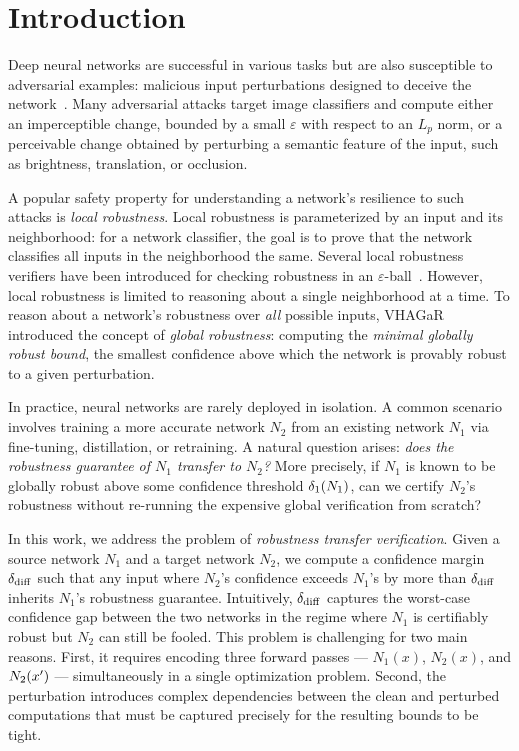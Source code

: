 \section{Introduction}
\label{sec:intro}

Deep neural networks are successful in various tasks but are also susceptible to adversarial examples: malicious input perturbations designed to deceive the network~\cite{szegedy2014,carlini2017,madry2018}. Many adversarial attacks target image classifiers and compute either an imperceptible change, bounded by a small $\varepsilon$ with respect to an $L_p$ norm, or a perceivable change obtained by perturbing a semantic feature of the input, such as brightness, translation, or occlusion.

A popular safety property for understanding a network's resilience to such attacks is \emph{local robustness}. Local robustness is parameterized by an input and its neighborhood: for a network classifier, the goal is to prove that the network classifies all inputs in the neighborhood the same. Several local robustness verifiers have been introduced for checking robustness in an $\varepsilon$-ball~\cite{singh2019,tjeng2019,wang2021}. However, local robustness is limited to reasoning about a single neighborhood at a time. To reason about a network's robustness over \emph{all} possible inputs, VHAGaR~\cite{vaghar} introduced the concept of \emph{global robustness}: computing the \emph{minimal globally robust bound}, the smallest confidence above which the network is provably robust to a given perturbation.

In practice, neural networks are rarely deployed in isolation. A common scenario involves training a more accurate network $N_2$ from an existing network $N_1$ via fine-tuning, distillation, or retraining. A natural question arises: \emph{does the robustness guarantee of $N_1$ transfer to $N_2$?} More precisely, if $N_1$ is known to be globally robust above some confidence threshold $\delta_1(N_{1})$, can we certify $N_2$'s robustness without re-running the expensive global verification from scratch?

In this work, we address the problem of \emph{robustness transfer verification}. Given a source network $N_1$ and a target network $N_2$, we compute a confidence margin $\delta_{\mathrm{diff}}$ such that any input where $N_2$'s confidence exceeds $N_1$'s by more than $\delta_{\mathrm{diff}}$ inherits $N_1$'s robustness guarantee. Intuitively, $\delta_{\mathrm{diff}}$ captures the worst-case confidence gap between the two networks in the regime where $N_1$ is certifiably robust but $N_2$ can still be fooled. This problem is challenging for two main reasons. First, it requires encoding three forward passes --- $N_1(x)$, $N_2(x)$, and $N_2(x')$ --- simultaneously in a single optimization problem. Second, the perturbation introduces complex dependencies between the clean and perturbed computations that must be captured precisely for the resulting bounds to be tight.

